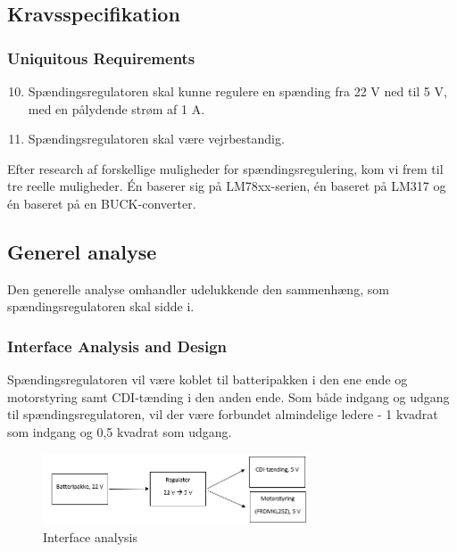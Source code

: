 \subsection{Kravsspecifikation}
\label{sec:kravsspecifikation-2}

\subsubsection{Uniquitous Requirements}
\label{sec:kravsspecifikation-3}

\begin{enumerate}[label=2.1.1.\arabic*]
  \setcounter{enumi}{9}
\item Spændingsregulatoren skal kunne regulere en spænding fra 22 V ned til 5 V, med en pålydende strøm af 1 A. 
\item Spændingsregulatoren skal være vejrbestandig.
\end{enumerate}

Efter research af forskellige muligheder for spændingsregulering, kom vi frem til tre reelle muligheder. Én baserer sig på LM78xx-serien, én baseret på LM317 og én baseret på en BUCK-converter.

\subsection{Generel analyse}
\label{sec:generel-analyse-}

Den generelle analyse omhandler udelukkende den sammenhæng, som spændingsregulatoren skal sidde i.

\subsubsection{Interface Analysis and Design}
\label{sec:generel-analyse}

Spændingsregulatoren vil være koblet til batteripakken i den ene ende og motorstyring samt CDI-tænding i den anden ende. Som både indgang og udgang til spændingsregulatoren, vil der være forbundet almindelige ledere - 1 kvadrat som indgang og 0,5 kvadrat som udgang.

\begin{figure}[h]
  \centering
  \includegraphics[width=0.7\textwidth]{./figurer/j1.png}
  \caption{Interface analysis}
  \label{fig:j1}
\end{figure}

